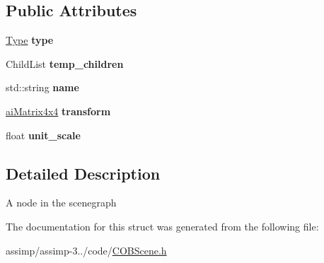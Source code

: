 \subsection*{Public Attributes}
\begin{DoxyCompactItemize}
\item 
\hypertarget{struct_assimp_1_1_c_o_b_1_1_node_a6b5da92c3a11d0ab534f7a8720c79e12}{\hyperlink{struct_type}{Type} {\bfseries type}}\label{struct_assimp_1_1_c_o_b_1_1_node_a6b5da92c3a11d0ab534f7a8720c79e12}

\item 
\hypertarget{struct_assimp_1_1_c_o_b_1_1_node_a648d9455a2740b47edbd37bf35795e94}{Child\+List {\bfseries temp\+\_\+children}}\label{struct_assimp_1_1_c_o_b_1_1_node_a648d9455a2740b47edbd37bf35795e94}

\item 
\hypertarget{struct_assimp_1_1_c_o_b_1_1_node_a9eb1e33c2315dd65adfce43a63444c40}{std\+::string {\bfseries name}}\label{struct_assimp_1_1_c_o_b_1_1_node_a9eb1e33c2315dd65adfce43a63444c40}

\item 
\hypertarget{struct_assimp_1_1_c_o_b_1_1_node_aa0efddbe40cebc2cfe8b3a94b91d0405}{\hyperlink{structai_matrix4x4}{ai\+Matrix4x4} {\bfseries transform}}\label{struct_assimp_1_1_c_o_b_1_1_node_aa0efddbe40cebc2cfe8b3a94b91d0405}

\item 
\hypertarget{struct_assimp_1_1_c_o_b_1_1_node_a36e48f4194a9dc0f4701df4c2183311c}{float {\bfseries unit\+\_\+scale}}\label{struct_assimp_1_1_c_o_b_1_1_node_a36e48f4194a9dc0f4701df4c2183311c}

\end{DoxyCompactItemize}


\subsection{Detailed Description}
A node in the scenegraph 

The documentation for this struct was generated from the following file\+:\begin{DoxyCompactItemize}
\item 
assimp/assimp-\/3../code/\hyperlink{_c_o_b_scene_8h}{C\+O\+B\+Scene.\+h}\end{DoxyCompactItemize}
